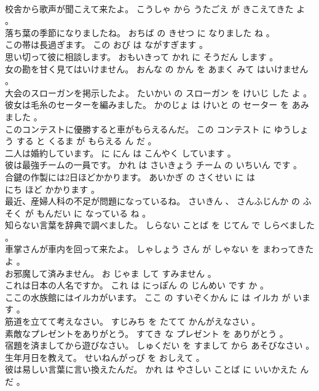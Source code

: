 \documentclass[8pt]{extreport}
\begin{document}
\begin{CJK}{UTF8}{min}
\\	校舎から歌声が聞こえて来たよ。	こうしゃ から うたごえ が きこえてきた よ 。 
\\	落ち葉の季節になりましたね。	おちば の きせつ に なりました ね 。 
\\	この帯は長過ぎます。	この おび は ながすぎます 。 
\\	思い切って彼に相談します。	おもいきって かれ に そうだん します 。 
\\	女の勘を甘く見てはいけません。	おんな の かん を あまく みて はいけません 。 
\\	大会のスローガンを掲示したよ。	たいかい の スローガン を けいじ した よ 。 
\\	彼女は毛糸のセーターを編みました。	かのじょ は けいと の セーター を あみました 。 
\\	このコンテストに優勝すると車がもらえるんだ。	この コンテスト に ゆうしょう する と くるま が もらえる ん だ 。 
\\	二人は婚約しています。	に にん は こんやく しています 。 
\\	彼は最強チームの一員です。	かれ は さいきょう チーム の いちいん です 。 
\\	合鍵の作製には2日ほどかかります。	あいかぎ の さくせい に は 
\\	にち ほど かかります 。 
\\	最近、産婦人科の不足が問題になっているね。	さいきん 、 さんふじんか の ふそく が もんだい に なっている ね 。 
\\	知らない言葉を辞典で調べました。	しらない ことば を じてん で しらべました 。 
\\	車掌さんが車内を回って来たよ。	しゃしょう さん が しゃない を まわってきた よ 。 
\\	お邪魔して済みません。	お じゃま して すみません 。 
\\	これは日本の人名ですか。	これ は にっぽん の じんめい です か 。 
\\	ここの水族館にはイルカがいます。	ここ の すいぞくかん に は イルカ が います 。 
\\	筋道を立てて考えなさい。	すじみち を たてて かんがえなさい 。 
\\	素敵なプレゼントをありがとう。	すてき な プレゼント を ありがとう 。 
\\	宿題を済ましてから遊びなさい。	しゅくだい を すまして から あそびなさい 。 
\\	生年月日を教えて。	せいねんがっぴ を おしえて 。 
\\	彼は易しい言葉に言い換えたんだ。	かれ は やさしい ことば に いいかえた ん だ 。 

\end{CJK}
\end{document}
